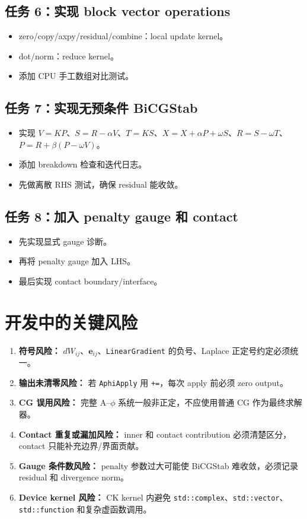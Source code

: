 \documentclass[UTF8,a4paper,11pt]{ctexart}
\newcommand{\code}[1]{\texttt{#1}}
\begin{document}
\subsection*{任务 6：实现 block vector operations}
\begin{itemize}
  \item zero/copy/axpy/residual/combine：local update kernel。
  \item dot/norm：reduce kernel。
  \item 添加 CPU 手工数组对比测试。
\end{itemize}

\subsection*{任务 7：实现无预条件 BiCGStab}
\begin{itemize}
  \item 实现 $V=KP$、$S=R-\alpha V$、$T=KS$、$X=X+\alpha P+\omega S$、$R=S-\omega T$、$P=R+\beta(P-\omega V)$。
  \item 添加 breakdown 检查和迭代日志。
  \item 先做离散 RHS 测试，确保 residual 能收敛。
\end{itemize}

\subsection*{任务 8：加入 penalty gauge 和 contact}
\begin{itemize}
  \item 先实现显式 gauge 诊断。
  \item 再将 penalty gauge 加入 LHS。
  \item 最后实现 contact boundary/interface。
\end{itemize}

\section{开发中的关键风险}

\begin{enumerate}
  \item \textbf{符号风险：} $dW_{ij}$、$\bm e_{ij}$、\code{LinearGradient} 的负号、Laplace 正定号约定必须统一。
  \item \textbf{输出未清零风险：} 若 \code{AphiApply} 用 \code{+=}，每次 apply 前必须 zero output。
  \item \textbf{CG 误用风险：} 完整 A--$\phi$ 系统一般非正定，不应使用普通 CG 作为最终求解器。
  \item \textbf{Contact 重复或漏加风险：} inner 和 contact contribution 必须清楚区分，contact 只能补充边界/界面贡献。
  \item \textbf{Gauge 条件数风险：} penalty 参数过大可能使 BiCGStab 难收敛，必须记录 residual 和 divergence norm。
  \item \textbf{Device kernel 风险：} CK kernel 内避免 \code{std::complex}、\code{std::vector}、\code{std::function} 和复杂虚函数调用。
\end{enumerate}
\end{document}
